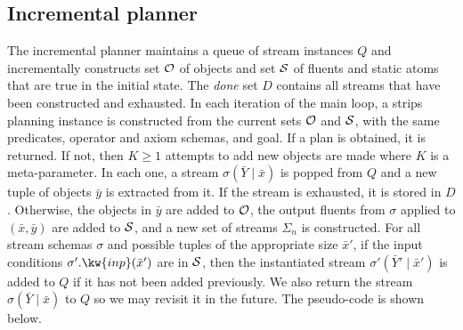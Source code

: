 \documentclass[letterpaper]{article} %
\theoremstyle{plain}\newtheorem{thm}{Theorem}
\theoremstyle{definition}\newtheorem{defn}{Definition}
\theoremstyle{plain}\newtheorem{lem}{Lemma}
\theoremstyle{plain}\newtheorem{cor}{Corollary}
\newcommand{\strips}{{\sc strips}}
\newcommand{\eager}{incremental}
\newcommand{\Eager}{Incremental}
\begin{document}
\subsection{\Eager{} planner} 

The \eager{} planner maintains a queue of
stream instances $Q$ and incrementally constructs set ${\cal O}$ of
objects and set ${\cal S}$ of fluents and static atoms that are true in the
initial state.  
The {\em done} set $D$ contains all streams that have been constructed and
exhausted.  In each iteration of the main loop, a \strips{} planning
instance is constructed from the current sets ${\cal
  O}$ and ${\cal S}$, with the same predicates, operator and axiom schemas, and goal.  If a
plan is obtained, it is returned.  If not, then $K \geq 1$ attempts to add
new objects are made where $K$ is a meta-parameter.
In each one, a stream $\sigma(\bar{Y}\mid\bar{x})$
is popped from $Q$ and a new tuple of objects $\bar{y}$ is extracted
from it.  If the stream is exhausted, it is stored in $D$.  
Otherwise, the objects in $\bar{y}$ are added to
${\cal O}$, the output fluents from $\sigma$ applied to $(\bar{x},
\bar{y})$ are added to ${\cal S}$, and a new set of streams $\Sigma_n$
is constructed.  For all stream schemas $\sigma$ and possible tuples
of the appropriate size $\bar{x}'$, if the input conditions
$\sigma'.\kw{inp}(\bar{x}')$ are in ${\cal S}$, then the instantiated
stream $\sigma'(\bar{Y}'\mid{\bar x}')$ is added to $Q$ if it has not
been added previously.  We also return the stream
$\sigma(\bar{Y}\mid\bar{x})$ to $Q$ so we may revisit it in the future.
The pseudo-code is shown below.
\end{document}
